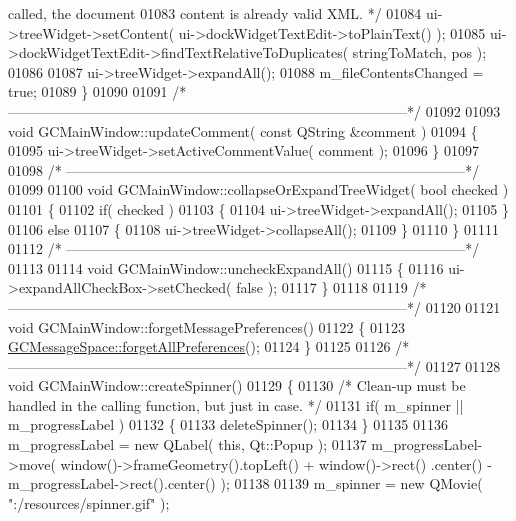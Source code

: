 \begin{DoxyCode}
{{{{{{{       called, the document}
01083 \textcolor{comment}{    content is already valid XML. */}
01084   ui->treeWidget->setContent( ui->dockWidgetTextEdit->toPlainText() );
01085   ui->dockWidgetTextEdit->findTextRelativeToDuplicates( stringToMatch, pos );
01086 
01087   ui->treeWidget->expandAll();
01088   m\_fileContentsChanged = \textcolor{keyword}{true};
01089 \}
01090 
01091 \textcolor{comment}{/*
      --------------------------------------------------------------------------------------*/}
01092 
01093 \textcolor{keywordtype}{void} GCMainWindow::updateComment( \textcolor{keyword}{const} QString &comment )
01094 \{
01095   ui->treeWidget->setActiveCommentValue( comment );
01096 \}
01097 
01098 \textcolor{comment}{/*
      --------------------------------------------------------------------------------------*/}
01099 
01100 \textcolor{keywordtype}{void} GCMainWindow::collapseOrExpandTreeWidget( \textcolor{keywordtype}{bool} checked )
01101 \{
01102   \textcolor{keywordflow}{if}( checked )
01103   \{
01104     ui->treeWidget->expandAll();
01105   \}
01106   \textcolor{keywordflow}{else}
01107   \{
01108     ui->treeWidget->collapseAll();
01109   \}
01110 \}
01111 
01112 \textcolor{comment}{/*
      --------------------------------------------------------------------------------------*/}
01113 
01114 \textcolor{keywordtype}{void} GCMainWindow::uncheckExpandAll()
01115 \{
01116   ui->expandAllCheckBox->setChecked( \textcolor{keyword}{false} );
01117 \}
01118 
01119 \textcolor{comment}{/*
      --------------------------------------------------------------------------------------*/}
01120 
01121 \textcolor{keywordtype}{void} GCMainWindow::forgetMessagePreferences()
01122 \{
01123   \hyperlink{namespace_g_c_message_space_ad9b01668af8368ac7e2c69065d45bf19}{GCMessageSpace::forgetAllPreferences}();
01124 \}
01125 
01126 \textcolor{comment}{/*
      --------------------------------------------------------------------------------------*/}
01127 
01128 \textcolor{keywordtype}{void} GCMainWindow::createSpinner()
01129 \{
01130   \textcolor{comment}{/* Clean-up must be handled in the calling function, but just in case. */}
01131   \textcolor{keywordflow}{if}( m\_spinner || m\_progressLabel )
01132   \{
01133     deleteSpinner();
01134   \}
01135 
01136   m\_progressLabel = \textcolor{keyword}{new} QLabel( \textcolor{keyword}{this}, Qt::Popup );
01137   m\_progressLabel->move( window()->frameGeometry().topLeft() + window()->rect()
      .center() - m\_progressLabel->rect().center() );
01138 
01139   m\_spinner = \textcolor{keyword}{new} QMovie( \textcolor{stringliteral}{":/resources/spinner.gif"} );
}}}}}}
\end{DoxyCode}
